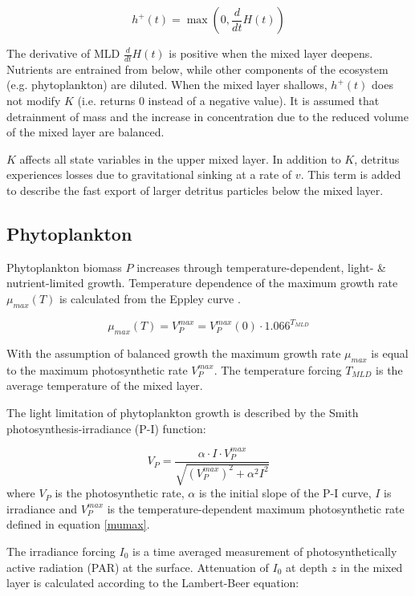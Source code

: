 \documentclass[journal abbreviation, manuscript]{copernicus}
\begin{document}
\begin{equation}
    h^{+}(t) = \max\left(0, \frac{d}{d t} H(t)\right)
\end{equation}

The derivative of MLD $\frac{d}{d t} H(t)$ is positive when the mixed layer deepens. Nutrients are entrained from below, while other components of the ecosystem (e.g. phytoplankton) are diluted. When the mixed layer shallows, $h^{+}(t)$ does not modify $K$ (i.e. returns 0 instead of a negative value). It is assumed that detrainment of mass and the increase in concentration due to the reduced volume of the mixed layer are balanced.

$K$ affects all state variables in the upper mixed layer. In addition to $K$, detritus experiences losses due to gravitational sinking at a rate of $v$. This term is added to describe the fast export of larger detritus particles below the mixed layer. 

\subsection{Phytoplankton}
Phytoplankton biomass $P$ increases through temperature-dependent, light- \& nutrient-limited growth. Temperature dependence of the maximum growth rate $\mu_{max}(T)$ is calculated from the Eppley curve \citep{Eppley1972TemperatureSea}.

\begin{equation}
    \mu_{max}(T) = V^{max}_P = V^{max}_P(0) \cdot 1.066^{T_{MLD}} \label{mumax}
\end{equation}

With the assumption of balanced growth the maximum growth rate $\mu_{max}$ is equal to the maximum photosynthetic rate $V^{max}_P$. The temperature forcing $T_{MLD}$ is the average temperature of the mixed layer.

The light limitation of phytoplankton growth is described by the Smith photosynthesis-irradiance (P-I) function:

\begin{equation}
    V_P = \frac{\alpha \cdot I \cdot V^{max}_P}{\sqrt{(V^{max}_P)^2 + \alpha^2 I^2}}
\end{equation}
where $V_P$ is the photosynthetic rate, $\alpha$ is the initial slope of the P-I curve, $I$ is irradiance and $V^{max}_P$ is the temperature-dependent maximum photosynthetic rate defined in equation \eqref{mumax}.


The irradiance forcing $I_0$ is a time averaged measurement of photosynthetically active radiation (PAR) at the surface. Attenuation of $I_0$ at depth $z$ in the mixed layer is calculated according to the Lambert-Beer equation:
\end{document}
